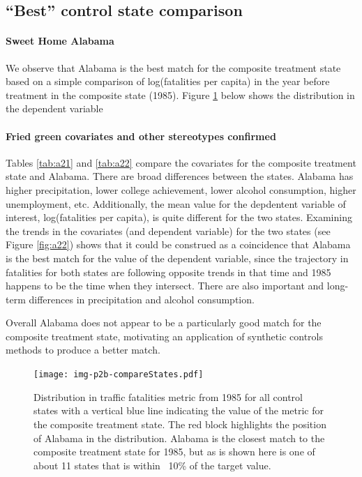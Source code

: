 \documentclass[letterpaper, 12pt]{article}
\begin{document}
\subsection{``Best'' control state comparison}

\paragraph{Sweet Home Alabama} 
We observe that Alabama is the best match for the composite treatment state based on a simple comparison of log(fatalities per capita) in the year before treatment in the composite state (1985).  Figure \ref{fig:a21} below shows the distribution in the dependent variable 

\paragraph{Fried green covariates and other stereotypes confirmed}
Tables \ref{tab:a21} and \ref{tab:a22} compare the covariates for the composite treatment state and Alabama.  There are broad differences between the states.  Alabama has higher precipitation, lower college achievement, lower alcohol consumption, higher unemployment, etc.  Additionally, the mean value for the depdentent variable of interest, log(fatalities per capita), is quite different for the two states.  Examining the trends in the covariates (and dependent variable) for the two states (see Figure \ref{fig:a22}) shows that it could be construed as a coincidence that Alabama is the best match for the value of the dependent variable, since the trajectory in fatalities for both states are following opposite trends in that time and 1985 happens to be the time when they intersect.  There are also important and long-term differences in precipitation and alcohol consumption.  

Overall Alabama does not appear to be a particularly good match for the composite treatment state, motivating an application of synthetic controls methods to produce a better match.  

\begin{figure}[htbp]
\begin{center}
\texttt{[image: img-p2b-compareStates.pdf]}
\caption{Distribution in traffic fatalities metric from 1985 for all control states with a vertical blue line indicating the value of the metric for the composite treatment state.  The red block highlights the position of Alabama in the distribution.  Alabama is the closest match to the composite treatment state for 1985, but as is shown here is one of about 11 states that is within ~10\% of the target value.}
\label{fig:a21}
\end{center}
\end{figure}
\end{document}

